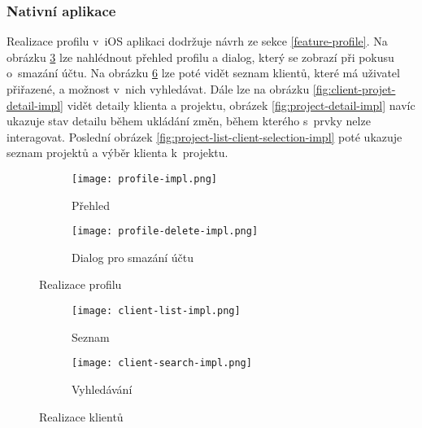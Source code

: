 \subsubsection{Nativní aplikace}

Realizace profilu v~iOS aplikaci dodržuje návrh ze sekce \ref{feature-profile}. Na obrázku \ref{fig:profile-impl} lze nahlédnout přehled profilu a dialog, který se zobrazí při pokusu o~smazání účtu. Na obrázku \ref{fig:clients-impl} lze poté vidět seznam klientů, které má uživatel přiřazené, a možnost v~nich vyhledávat. Dále lze na obrázku \ref{fig:client-projet-detail-impl} vidět detaily klienta a projektu, obrázek \ref{fig:project-detail-impl} navíc ukazuje stav detailu během ukládání změn, během kterého s~prvky nelze interagovat. Poslední obrázek \ref{fig:project-list-client-selection-impl} poté ukazuje seznam projektů a výběr klienta k~projektu.

\begin{figure}[p]
    \centering
    \begin{subfigure}[b]{0.4\textwidth}
		\centering
		\texttt{[image: profile-impl.png]}
		\caption{Přehled}
		\label{fig:profile-overview-impl}
	\end{subfigure}
	\hspace{2cm}
	\begin{subfigure}[b]{0.4\textwidth}
		\centering
		\texttt{[image: profile-delete-impl.png]}
		\caption{Dialog pro smazání účtu}
		\label{fig:profile-delete-impl}
	\end{subfigure}
	\caption{Realizace profilu}
	\label{fig:profile-impl}
\end{figure}

\begin{figure}[p]
    \centering
    \begin{subfigure}[b]{0.4\textwidth}
		\centering
		\texttt{[image: client-list-impl.png]}
		\caption{Seznam}
		\label{fig:client-list-impl}
	\end{subfigure}
	\hspace{2cm}
	\begin{subfigure}[b]{0.4\textwidth}
		\centering
		\texttt{[image: client-search-impl.png]}
		\caption{Vyhledávání}
		\label{fig:client-search-impl}
	\end{subfigure}
	\caption{Realizace klientů}
	\label{fig:clients-impl}
\end{figure}

